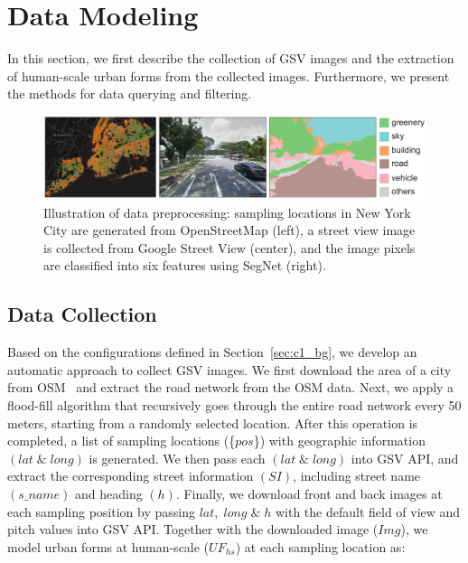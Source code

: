 \section{Data Modeling}
In this section, we first describe the collection of GSV images and the extraction of human-scale urban forms from the collected images.
Furthermore, we present the methods for data querying and filtering.

\begin{figure}[t]
	\centering
	\includegraphics[width=\columnwidth]{figure/streetvizor/fig3_data_preprocess/data_process}
	\vspace{-7mm}
	\caption{Illustration of data preprocessing: sampling locations in New York City are generated from OpenStreetMap (left), a street view image is collected from Google Street View (center), and the image pixels are classified into six features using SegNet (right).}
	\label{fig:c1_data_preprocess}
	\vspace{-4mm}
\end{figure}

\subsection{Data Collection}
\label{ssec:c1_data_collection}

Based on the configurations defined in Section~\ref{sec:c1_bg}, we develop an automatic approach to collect GSV images.
We first download the area of a city from OSM~\cite{osm_api} and extract the road network from the OSM data.
Next, we apply a flood-fill algorithm that recursively goes through the entire road network every 50 meters, starting from a randomly selected location.
After this operation is completed, a list of sampling locations (\{$pos$\}) with geographic information $(lat \; \& \; long)$ is generated.
We then pass each $(lat \; \& \; long)$ into GSV API, and extract the corresponding street information $(SI)$, including street name $(s\_name)$ and heading $(h)$. 
Finally, we download front and back images at each sampling position by passing $lat, \; long \; \& \; h$ with the default field of view and pitch values into GSV API.
Together with the downloaded image ($Img$), we model urban forms at human-scale ($UF_{hs}$) at each sampling location as: 

